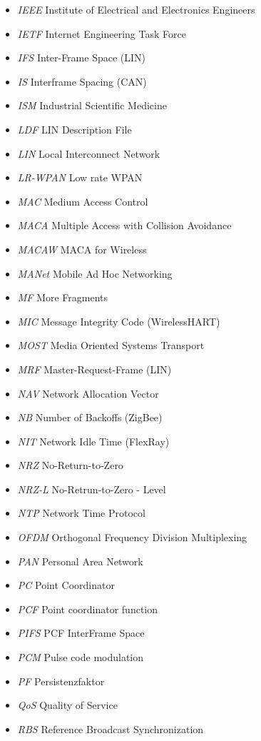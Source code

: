 \documentclass{article}
\begin{document}
\begin{itemize}
	\item \emph{IEEE} Institute of Electrical and Electronics Engineers
	\item \emph{IETF} Internet Engineering Task Force
	\item \emph{IFS} Inter-Frame Space (LIN)
	\item \emph{IS} Interframe Spacing (CAN)
	\item \emph{ISM} Industrial Scientific Medicine
	\item \emph{LDF} LIN Description File
	\item \emph{LIN} Local Interconnect Network
	\item \emph{LR-WPAN} Low rate WPAN
	\item \emph{MAC} Medium Access Control
	\item \emph{MACA} Multiple Access with Collision Avoidance
	\item \emph{MACAW} MACA for Wireless
	\item \emph{MANet} Mobile Ad Hoc Networking
	\item \emph{MF} More Fragments
	\item \emph{MIC} Message Integrity Code (WirelessHART)
	\item \emph{MOST} Media Oriented Systems Transport
	\item \emph{MRF} Master-Request-Frame (LIN)
	\item \emph{NAV} Network Allocation Vector
	\item \emph{NB} Number of Backoffs (ZigBee)
	\item \emph{NIT} Network Idle Time (FlexRay)
	\item \emph{NRZ} No-Return-to-Zero
	\item \emph{NRZ-L} No-Retrun-to-Zero - Level
	\item \emph{NTP} Network Time Protocol
	\item \emph{OFDM} Orthogonal Frequency Division Multiplexing
	\item \emph{PAN} Personal Area Network
	\item \emph{PC} Point Coordinator
	\item \emph{PCF} Point coordinator function
	\item \emph{PIFS} PCF InterFrame Space
	\item \emph{PCM} Pulse code modulation
	\item \emph{PF} Persistenzfaktor
	\item \emph{QoS} Quality of Service
	\item \emph{RBS} Reference Broadcast Synchronization

\end{itemize}
\end{document}

